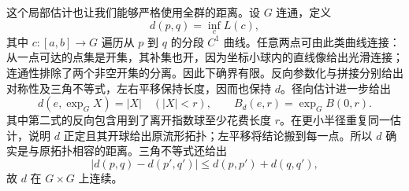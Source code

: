 这个局部估计也让我们能够严格使用全群的距离。设 \(G\) 连通，定义
\[
	d(p,q)=\inf_c L(c),
\]
其中 \(c:[a,b]\to G\) 遍历从 \(p\) 到 \(q\) 的分段 \(C^1\) 曲线。任意两点可由此类曲线连接：从一点可达的点集是开集，其补集也开，因为坐标小球内的直线像给出光滑连接；连通性排除了两个非空开集的分离。因此下确界有限。反向参数化与拼接分别给出对称性及三角不等式，左右平移保持长度，因而也保持 \(d\)。径向估计进一步给出
\begin{equation}\label{g1:eq:compact-group-local-distance}
	d(e,\exp_GX)=|X|\quad(|X|<r),\qquad
	B_d(e,r)=\exp_GB(0,r).
\end{equation}
其中第二式的反向包含用到了离开指数球至少花费长度 \(r\)。在更小半径重复同一估计，说明 \(d\) 正定且其开球给出原流形拓扑；左平移将结论搬到每一点。所以 \(d\) 确实是与原拓扑相容的距离。三角不等式还给出
\[
	|d(p,q)-d(p',q')|\le d(p,p')+d(q,q'),
\]
故 \(d\) 在 \(G\times G\) 上连续。

